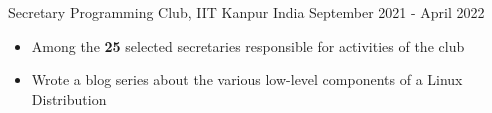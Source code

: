 \cventry
{Secretary} %
{Programming Club, IIT Kanpur} %
{India} %
{September 2021 - April 2022} %
{
  \begin{itemize} %
    \item Among the \textbf{25} selected secretaries responsible for activities of the club
    \item Wrote a blog series about the various low-level components of a Linux Distribution
  \end{itemize}
}
